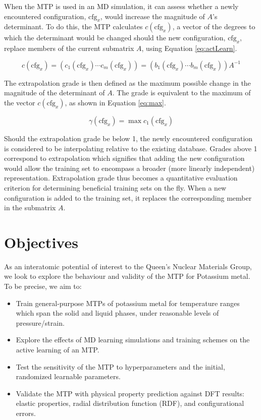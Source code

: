 \documentclass[9pt,twocolumn,twoside]{opticajnl}
\begin{document}
When the MTP is used in an MD simulation, it can assess whether a newly encountered configuration, $\textrm{cfg}_x$, would increase the magnitude of $A$'s determinant. To do this, the MTP calculates $c(\textrm{cfg}_x)$, a vector of the degrees to which the determinant would be changed should the new configuration, $\textrm{cfg}_x$, replace members of the current submatrix $A$, using Equation \ref{eq:actLearn}. 

\begin{equation} \label{eq:actLearn}
  c(\textrm{cfg}_x)  = (c_1(\textrm{cfg}_x) \cdots c_m(\textrm{cfg}_x)) = (b_1(\textrm{cfg}_x) \cdots b_m(\textrm{cfg}_x)) A^{-1}
\end{equation}

The extrapolation grade is then defined as the maximum possible change in the magnitude of the determinant of $A$. The grade is equivalent to the maximum of the vector $c(\textrm{cfg}_x)$, as shown in Equation \ref{eq:max}.

\begin{equation}    \label{eq:max}
  \gamma(\textrm{cfg}_x) = \max c_1(\textrm{cfg}_x)
\end{equation}

Should the extrapolation grade be below 1, the newly encountered configuration is considered to be interpolating relative to the existing database. Grades above 1 correspond to extrapolation which signifies that adding the new configuration would allow the training set to encompass a broader (more linearly independent) representation. Extrapolation grade thus becomes a quantitative evaluation criterion for determining beneficial training sets on the fly. When a new configuration is added to the training set, it replaces the corresponding member in the submatrix $A$.

\section{Objectives}
As an interatomic potential of interest to the Queen's Nuclear Materials Group, we look to explore the behaviour and validity of the MTP for Potassium metal. To be precise, we aim to:
\begin{itemize}
  \itemsep0em
  \item Train general-purpose MTPs of potassium metal for temperature ranges which span the solid and liquid phases, under reasonable levels of pressure/strain. 
  \item Explore the effects of MD learning simulations and training schemes on the active learning of an MTP.
  \item  Test the sensitivity of the MTP to hyperparameters and the initial, randomized learnable parameters. 
  \item Validate the MTP with physical property prediction against DFT results: elastic properties, radial distribution function (RDF), and configurational errors.
\end{itemize}
\end{document}
